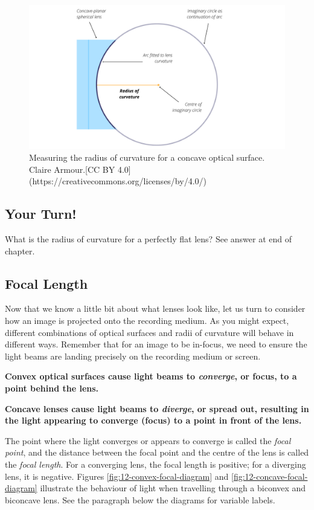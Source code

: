 \documentclass[
]{book}
\begin{document}
\begin{figure}
\includegraphics[width=0.9\linewidth]{images/12-ROC_concave} \caption{Measuring the radius of curvature for a concave optical surface. Claire Armour.[CC BY 4.0](https://creativecommons.org/licenses/by/4.0/)}\label{fig:12-RoC-concave}
\end{figure}

\hypertarget{your-turn-6}{%
\subsection*{Your Turn!}\label{your-turn-6}}

What is the radius of curvature for a perfectly flat lens? See answer at end of chapter.

\hypertarget{focal-length}{%
\subsection{Focal Length}\label{focal-length}}

Now that we know a little bit about what lenses look like, let us turn to consider how an image is projected onto the recording medium. As you might expect, different combinations of optical surfaces and radii of curvature will behave in different ways. Remember that for an image to be in-focus, we need to ensure the light beams are landing precisely on the recording medium or screen.

\textbf{Convex optical surfaces cause light beams to \emph{converge}, or focus, to a point behind the lens.}

\textbf{Concave lenses cause light beams to \emph{diverge}, or spread out, resulting in the light appearing to converge (focus) to a point in front of the lens.}

The point where the light converges or appears to converge is called the \emph{focal point}, and the distance between the focal point and the centre of the lens is called the \emph{focal length}. For a converging lens, the focal length is positive; for a diverging lens, it is negative. Figures \ref{fig:12-convex-focal-diagram} and \ref{fig:12-concave-focal-diagram} illustrate the behaviour of light when travelling through a biconvex and biconcave lens. See the paragraph below the diagrams for variable labels.
\end{document}
